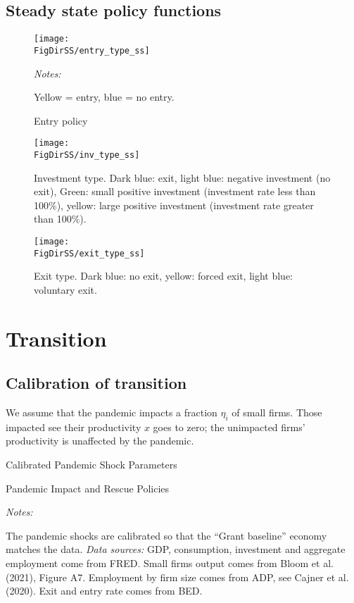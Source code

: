 \documentclass[11pt,english]{article}
\newcommand*{\TabDir}{../tables}
\newcommand*{\FigDirSS}{../figures/ss}
\begin{document}
\FloatBarrier

\subsection{Steady state policy functions}

    \begin{figure}[htbp]
    	\centering
    		\texttt{[image: \\FigDirSS/entry\_type\_ss]}
    		\caption{Entry policy}	
    		{\textit{Notes:} \raggedright Yellow = entry, blue = no entry.  \par}
    \end{figure}

	\begin{figure}[htbp]
	 	\centering
			\texttt{[image: \\FigDirSS/inv\_type\_ss]}
			\caption{Investment type. Dark blue: exit, light blue: negative investment (no exit), Green: small positive investment (investment rate less than 100\%), yellow: large positive investment (investment rate greater than 100\%). }
	\end{figure}


\begin{figure}[htbp]
	\centering
		\texttt{[image: \\FigDirSS/exit\_type\_ss]}
		\caption{Exit type. Dark blue: no exit, yellow: forced exit, light blue: voluntary exit.}
\end{figure}

\FloatBarrier
	
\section{Transition \label{sec:irf}}
	
\subsection{Calibration of transition}

We assume that the pandemic impacts a fraction $\eta_i$ of small firms. Those impacted see their productivity $x$ goes to zero; the unimpacted firms' productivity is unaffected by the pandemic.

\begin{table}[htbp]
	
	\caption{Calibrated Pandemic Shock Parameters}
\end{table}
	
\bigskip
	
\begin{table}[H]
	
	\caption{Pandemic Impact and Rescue Policies}
	\label{tab:transition}

	\vspace{1ex}
	{\textit{Notes:} \raggedright The pandemic shocks are calibrated so that the ``Grant baseline'' economy matches the data. \textit{Data sources:} GDP, consumption, investment and aggregate employment come from FRED. Small firms output comes from Bloom et al. (2021), Figure A7. Employment by firm size comes from ADP, see Cajner et al. (2020). Exit and entry rate comes from BED. \par}
\end{table}
\end{document}
